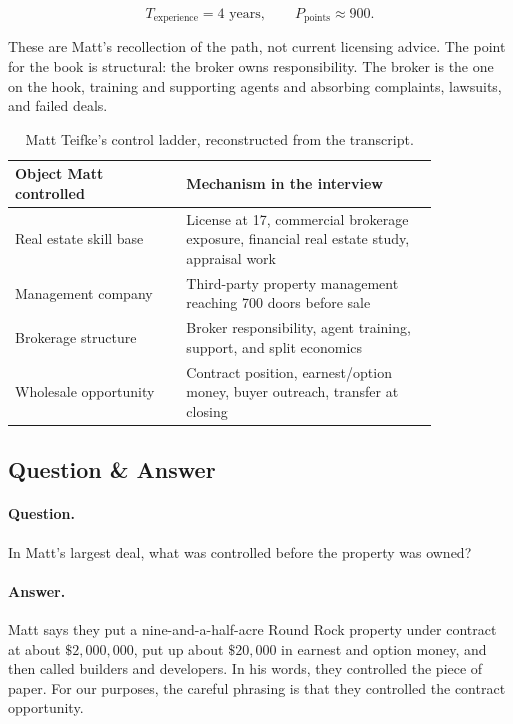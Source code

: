 \documentclass[11pt,oneside]{book}
\begin{document}
\begin{equation}
T_{\text{experience}}=4\text{ years},
\qquad
P_{\text{points}}\approx 900.
\end{equation}

These are Matt's recollection of the path, not current licensing advice. The point for the book is structural: the broker owns responsibility. The broker is the one on the hook, training and supporting agents and absorbing complaints, lawsuits, and failed deals.

\begin{table}
\centering
\begin{tabular}{|p{0.34\linewidth}|p{0.50\linewidth}|}
\hline
Object Matt controlled & Mechanism in the interview \\
\hline
Real estate skill base & License at 17, commercial brokerage exposure, financial real estate study, appraisal work \\
\hline
Management company & Third-party property management reaching 700 doors before sale \\
\hline
Brokerage structure & Broker responsibility, agent training, support, and split economics \\
\hline
Wholesale opportunity & Contract position, earnest/option money, buyer outreach, transfer at closing \\
\hline
\end{tabular}
\caption{Matt Teifke's control ladder, reconstructed from the transcript.}
\end{table}

\subsection{Question \& Answer}

\paragraph{Question.}
In Matt's largest deal, what was controlled before the property was owned?

\paragraph{Answer.}
Matt says they put a nine-and-a-half-acre Round Rock property under contract at about \(\$2{,}000{,}000\), put up about \(\$20{,}000\) in earnest and option money, and then called builders and developers. In his words, they controlled the piece of paper. For our purposes, the careful phrasing is that they controlled the contract opportunity.
\end{document}
